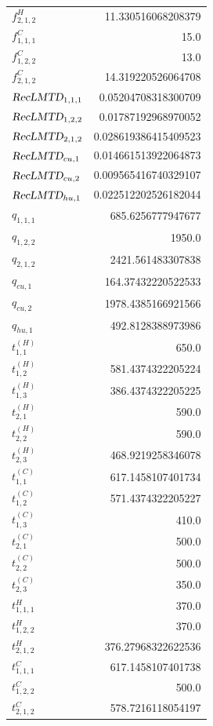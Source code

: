 \documentclass{article}%
\begin{document}
\begin{multicols*}{3}
\begin{supertabular}{lr}
	$f_{2,1,2}^{H}$ & 11.330516068208379 \\%
	$f_{1,1,1}^{C}$ & 15.0 \\%
	$f_{1,2,2}^{C}$ & 13.0 \\%
	$f_{2,1,2}^{C}$ & 14.319220526064708 \\%
	$\textsl{RecLMTD}_{1,1,1}$ & 0.05204708318300709 \\%
	$\textsl{RecLMTD}_{1,2,2}$ & 0.01787192968970052 \\%
	$\textsl{RecLMTD}_{2,1,2}$ & 0.028619386415409523 \\%
	$\textsl{RecLMTD}_{cu,1}$ & 0.014661513922064873 \\%
	$\textsl{RecLMTD}_{cu,2}$ & 0.009565416740329107 \\%
	$\textsl{RecLMTD}_{hu,1}$ & 0.022512202526182044 \\%
	$q_{1,1,1}$ & 685.6256777947677 \\%
	$q_{1,2,2}$ & 1950.0 \\%
	$q_{2,1,2}$ & 2421.561483307838 \\%
	$q_{cu,1}$ & 164.37432220522533 \\%
	$q_{cu,2}$ & 1978.4385166921566 \\%
	$q_{hu,1}$ & 492.8128388973986 \\%
	$t_{1,1}^{(H)}$ & 650.0 \\%
	$t_{1,2}^{(H)}$ & 581.4374322205224 \\%
	$t_{1,3}^{(H)}$ & 386.4374322205225 \\%
	$t_{2,1}^{(H)}$ & 590.0 \\%
	$t_{2,2}^{(H)}$ & 590.0 \\%
	$t_{2,3}^{(H)}$ & 468.9219258346078 \\%
	$t_{1,1}^{(C)}$ & 617.1458107401734 \\%
	$t_{1,2}^{(C)}$ & 571.4374322205227 \\%
	$t_{1,3}^{(C)}$ & 410.0 \\%
	$t_{2,1}^{(C)}$ & 500.0 \\%
	$t_{2,2}^{(C)}$ & 500.0 \\%
	$t_{2,3}^{(C)}$ & 350.0 \\%
	$t_{1,1,1}^{H}$ & 370.0 \\%
	$t_{1,2,2}^{H}$ & 370.0 \\%
	$t_{2,1,2}^{H}$ & 376.27968322622536 \\%
	$t_{1,1,1}^{C}$ & 617.1458107401738 \\%
	$t_{1,2,2}^{C}$ & 500.0 \\%
	$t_{2,1,2}^{C}$ & 578.7216118054197 \\%

\end{supertabular}
\end{multicols*}
\end{document}
